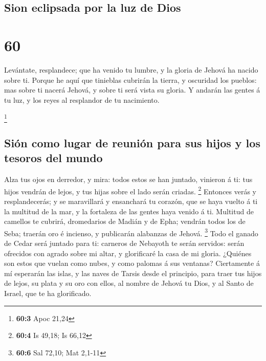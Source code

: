 \hypertarget{sion-eclipsada-por-la-luz-de-dios}{%
\subsection{Sion eclipsada por la luz de
Dios}\label{sion-eclipsada-por-la-luz-de-dios}}

\hypertarget{section-59}{%
\section{60}\label{section-59}}

 Levántate, resplandece; que ha venido tu lumbre, y la
gloria de Jehová ha nacido sobre ti.  Porque he aquí que
tinieblas cubrirán la tierra, y oscuridad los pueblos: mas sobre ti
nacerá Jehová, y sobre ti será vista su gloria.  Y andarán
las gentes á tu luz, y los reyes al resplandor de tu nacimiento.

\footnote{\textbf{60:3} Apoc 21,24}

\hypertarget{siuxf3n-como-lugar-de-reuniuxf3n-para-sus-hijos-y-los-tesoros-del-mundo}{%
\subsection{Sión como lugar de reunión para sus hijos y los tesoros del
mundo}\label{siuxf3n-como-lugar-de-reuniuxf3n-para-sus-hijos-y-los-tesoros-del-mundo}}

 Alza tus ojos en derredor, y mira: todos estos se han
juntado, vinieron á ti: tus hijos vendrán de lejos, y tus hijas sobre el
lado serán criadas. \footnote{\textbf{60:4} Is 49,18; Is 66,12}
 Entonces verás y resplandecerás; y se maravillará y
ensanchará tu corazón, que se haya vuelto á ti la multitud de la mar, y
la fortaleza de las gentes haya venido á ti.  Multitud de
camellos te cubrirá, dromedarios de Madián y de Epha; vendrán todos los
de Seba; traerán oro é incienso, y publicarán alabanzas de Jehová.
\footnote{\textbf{60:6} Sal 72,10; Mat 2,1-11}  Todo el
ganado de Cedar será juntado para ti: carneros de Nebayoth te serán
servidos: serán ofrecidos con agrado sobre mi altar, y glorificaré la
casa de mi gloria.  ¿Quiénes son estos que vuelan como
nubes, y como palomas á sus ventanas?  Ciertamente á mí
esperarán las islas, y las naves de Tarsis desde el principio, para
traer tus hijos de lejos, su plata y su oro con ellos, al nombre de
Jehová tu Dios, y al Santo de Israel, que te ha glorificado.

